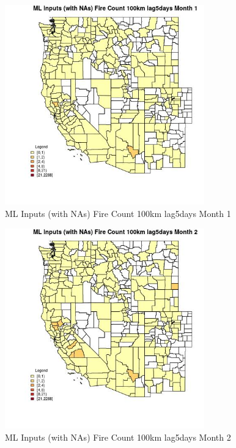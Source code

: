 \begin{figure} 
\centering  
\includegraphics[width=0.77\textwidth]{Code_Outputs/Report_ML_input_PM25_Step4_part_e_de_duplicated_aves_compiled_2019-05-21wNAs_CountyFire_Count_100km_lag5daysmedianMonth1.jpg} 
\caption{\label{fig:Report_ML_input_PM25_Step4_part_e_de_duplicated_aves_compiled_2019-05-21wNAsCountyFire_Count_100km_lag5daysmedianMonth1}ML Inputs (with NAs) Fire Count 100km lag5days Month 1} 
\end{figure} 
 

\begin{figure} 
\centering  
\includegraphics[width=0.77\textwidth]{Code_Outputs/Report_ML_input_PM25_Step4_part_e_de_duplicated_aves_compiled_2019-05-21wNAs_CountyFire_Count_100km_lag5daysmedianMonth2.jpg} 
\caption{\label{fig:Report_ML_input_PM25_Step4_part_e_de_duplicated_aves_compiled_2019-05-21wNAsCountyFire_Count_100km_lag5daysmedianMonth2}ML Inputs (with NAs) Fire Count 100km lag5days Month 2} 
\end{figure} 
 


